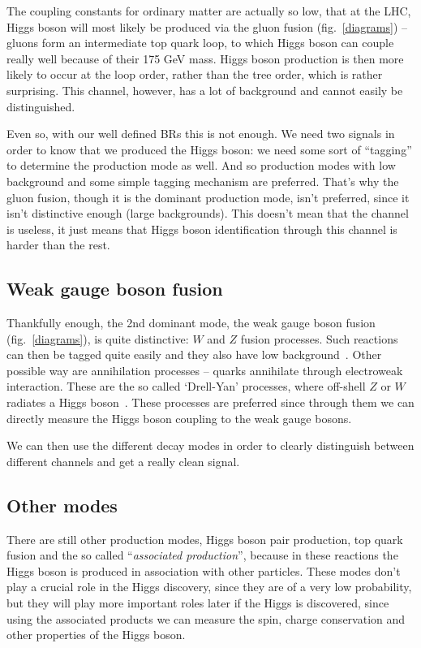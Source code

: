 The coupling constants for ordinary matter are actually so low, that at the LHC, Higgs boson will most likely be produced via the
gluon fusion (fig.~\ref{diagrams}) -- gluons form an intermediate top quark loop, to which Higgs boson can
couple really well because of their 175 GeV mass.
Higgs boson production is then more likely to occur at the loop order, rather than the tree order, which is
rather surprising. This channel, however, has a lot of background and cannot easily be distinguished.

Even so, with our well defined BRs this is not enough. We need two signals in order to know that we produced the Higgs boson:
we need some sort of ``tagging'' to determine the production mode as well. And so production modes with low background and some
simple tagging mechanism are preferred. That's why the gluon fusion, though it is the dominant production mode, isn't preferred,
since it isn't distinctive enough (large backgrounds). This doesn't mean that the channel is useless, it just means that Higgs boson
identification through this channel is harder than the rest.

\subsection{Weak gauge boson fusion}

Thankfully enough, the 2nd dominant mode, the weak gauge boson fusion (fig.~\ref{diagrams}), is quite distinctive: $W$ and $Z$ fusion
processes. Such reactions
can then be tagged quite easily and they also have low background~\cite[pg.~157]{elena:green}. Other possible way are annihilation
processes -- quarks
annihilate through electroweak interaction. These are the so called `Drell-Yan' processes, where off-shell $Z$ or $W$ radiates a Higgs
boson~\cite[pg.~158]{elena:green}. These processes are preferred since through them we can directly measure the Higgs boson
coupling to the weak gauge bosons.

We can then use the different decay modes in order to clearly distinguish between different channels and get a really clean signal.

\subsection{Other modes}

There are still other production modes, Higgs boson pair production, top quark fusion and the so called ``\emph{associated production}'', because in these
reactions the Higgs boson is produced in association with other particles. These modes don't play a crucial role in the Higgs discovery, since
they are of a very low probability, but they will play more important roles later if the Higgs is discovered, since using the associated
products we can measure the spin, charge conservation and other properties of the Higgs boson.


